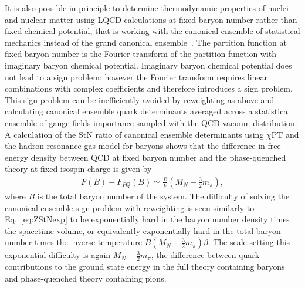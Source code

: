 It is also possible in principle to determine thermodynamic properties of nuclei and nuclear matter using LQCD calculations at fixed baryon number rather than fixed chemical potential, that is working with the canonical ensemble of statistical mechanics instead of the grand canonical ensemble~\cite{Roberge:1986mm,Hasenfratz:1991ax,Kratochvila:2005mk,Alexandru:2005ix,Gattringer:2009wi,Danzer:2012vw,Alexandru:2014hga}.
The partition function at fixed baryon number is the Fourier transform of the partition function with imaginary baryon chemical potential.
Imaginary baryon chemical potential does not lead to a sign problem; however the Fourier transform requires linear combinations with complex coefficients and therefore introduces a sign problem.
This sign problem can be inefficiently avoided by reweighting as above and calculating canonical ensemble quark determinants averaged across a statistical ensemble of gauge fields importance sampled with the QCD vacuum distribution.
A calculation of the StN ratio of canonical ensemble determinants using $\chi$PT and the hadron resonance gas model for baryons shows that the difference in free energy density  between QCD at fixed baryon number and the phase-quenched theory at fixed isospin charge is given by~\cite{Alexandru:2014hga}
\begin{equation}
  \begin{split}
    F(B) - F_{PQ}(B) \simeq \frac{B}{V}\left( M_N - \frac{3}{2}m_\pi \right),
  \end{split}\label{ZStNCanChPT}
\end{equation}
where $B$ is the total baryon number of the system.
The difficulty of solving the canonical ensemble sign problem with reweighting is seen similarly to Eq.~\eqref{eq:ZStNexp} to be exponentially hard in the baryon number density times the spacetime volume, or equivalently exponentially hard in the total baryon number times the inverse temperature $B(M_N - \frac{3}{2}m_\pi)\beta$.
The scale setting this exponential difficulty is again $M_N - \frac{3}{2}m_\pi$, 
the difference between quark contributions to the ground state energy in the full theory containing baryons and phase-quenched theory containing pions.


